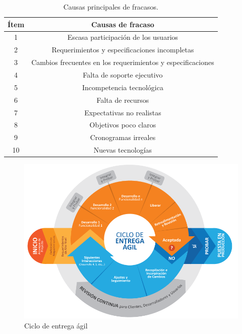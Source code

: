 		\begin{table}[htbp]
			\centering
			\begin{tabular}{|c|c|}
				\hline
				\rowcolor[HTML]{9B9B9B} 
				\textbf{Ítem} & \textbf{Causas de fracaso}                                  \\ \hline
				1             & Escasa participación de los usuarios                        \\ \hline
				2             & Requerimientos y especificaciones incompletas               \\ \hline
				3             & Cambios frecuentes en los requerimientos y especificaciones \\ \hline
				4             & Falta de soporte ejecutivo                                  \\ \hline
				5             & Incompetencia tecnológica                                   \\ \hline
				6             & Falta de recursos                                           \\ \hline
				7             & Expectativas no realistas                                   \\ \hline
				8             & Objetivos poco claros                                       \\ \hline
				9             & Cronogramas irreales                                        \\ \hline
				10            & Nuevas tecnologías                                          \\ \hline
			\end{tabular}
			\caption{Causas principales de fracasos.}
			\label{}
		\end{table}
			\begin{figure}
				\centering
				\includegraphics[width=0.7\linewidth]{graficos/agile}
				\caption{Ciclo de entrega ágil}
				\label{fig:agile}
			\end{figure}
			